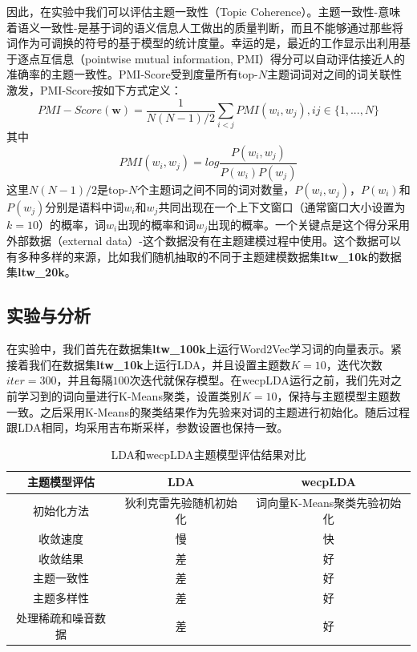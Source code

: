 \documentclass[master]{njuthesis}
\begin{document}
因此，在实验中我们可以评估主题一致性（Topic Coherence）。主题一致性-意味着语义一致性-是基于词的语义信息人工做出的质量判断，而且不能够通过那些将词作为可调换的符号的基于模型的统计度量。幸运的是，最近的工作显示出利用基于逐点互信息（pointwise mutual information, PMI）得分可以自动评估接近人的准确率的主题一致性\cite{newman2010automatic,newman2010evaluating}。PMI-Score受到度量所有top-$N$主题词词对之间的词关联性激发，PMI-Score按如下方式定义：
	\begin{equation}
	PMI-Score(\textbf{w})=\frac{1}{N(N-1)/2}\sum_{i<j}PMI(w_i, w_j),ij\in \{1, ..., N\}
	\end{equation}
	其中
	\begin{equation}
	PMI(w_i, w_j)=log\frac{P(w_i, w_j)}{P(w_i)P(w_j)}
	\end{equation}
这里$N(N-1)/2$是top-$N$个主题词之间不同的词对数量，$P(w_i, w_j)$，$P(w_i)$和$P(w_j)$分别是语料中词$w_i$和$w_j$共同出现在一个上下文窗口（通常窗口大小设置为$k=10$\cite{newman2010automatic}）的概率，词$w_i$出现的概率和词$w_j$出现的概率。一个关键点是这个得分采用外部数据（external data）-这个数据没有在主题建模过程中使用。这个数据可以有多种多样的来源，比如我们随机抽取的不同于主题建模数据集\textbf{ltw\_10k}的数据集\textbf{ltw\_20k}。

\subsection{实验与分析}\label{subsec_exp_results_chap5}

在实验中，我们首先在数据集\textbf{ltw\_100k}上运行Word2Vec学习词的向量表示。紧接着我们在数据集\textbf{ltw\_10k}上运行LDA，并且设置主题数$K=10$，迭代次数$iter=300$，并且每隔$100$次迭代就保存模型。在wecpLDA运行之前，我们先对之前学习到的词向量进行K-Means聚类，设置类别$K=10$，保持与主题模型主题数一致。之后采用K-Means的聚类结果作为先验来对词的主题进行初始化。随后过程跟LDA相同，均采用吉布斯采样，参数设置也保持一致。

\begin{table}[htbp]
\centering
\caption{LDA和wecpLDA主题模型评估结果对比}
\label{tab:exp_results_chap5}
\begin{tabular}{|c|c|c|}
\hline
\textbf{主题模型评估} & \textbf{LDA} & \textbf{wecpLDA} \\ \hline
初始化方法			 & 狄利克雷先验随机初始化	& 词向量K-Means聚类先验初始化	\\ \hline
收敛速度            & 慢            & 快                \\ \hline
收敛结果            & 差            & 好                \\ \hline
主题一致性           & 差            & 好                \\ \hline
主题多样性           & 差            & 好                \\ \hline
处理稀疏和噪音数据	& 差	 & 好		  \\ \hline
\end{tabular}
\end{table}
\end{document}
